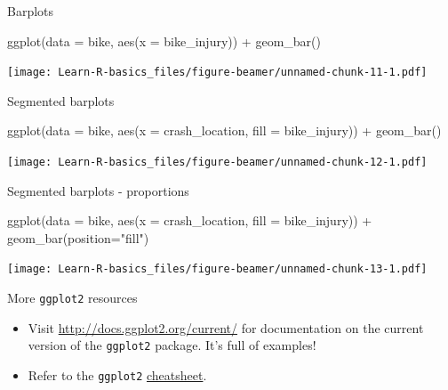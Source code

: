 \documentclass[
  ignorenonframetext,
]{beamer}
\newenvironment{Shaded}{\begin{snugshade}}{\end{snugshade}}
\newcommand{\AttributeTok}[1]{\textcolor[rgb]{0.77,0.63,0.00}{#1}}
\newcommand{\FunctionTok}[1]{\textcolor[rgb]{0.00,0.00,0.00}{#1}}
\newcommand{\NormalTok}[1]{#1}
\newcommand{\SpecialCharTok}[1]{\textcolor[rgb]{0.00,0.00,0.00}{#1}}
\newcommand{\StringTok}[1]{\textcolor[rgb]{0.31,0.60,0.02}{#1}}
\begin{document}
\begin{frame}[fragile]{Barplots}
\protect\hypertarget{barplots}{}
\begin{Shaded}
\begin{Highlighting}[]
\FunctionTok{ggplot}\NormalTok{(}\AttributeTok{data =}\NormalTok{ bike, }\FunctionTok{aes}\NormalTok{(}\AttributeTok{x =}\NormalTok{ bike\_injury)) }\SpecialCharTok{+}
  \FunctionTok{geom\_bar}\NormalTok{()}
\end{Highlighting}
\end{Shaded}

\texttt{[image: Learn-R-basics\_files/figure-beamer/unnamed-chunk-11-1.pdf]}
\end{frame}

\begin{frame}[fragile]{Segmented barplots}
\protect\hypertarget{segmented-barplots}{}
\begin{Shaded}
\begin{Highlighting}[]
\FunctionTok{ggplot}\NormalTok{(}\AttributeTok{data =}\NormalTok{ bike, }\FunctionTok{aes}\NormalTok{(}\AttributeTok{x =}\NormalTok{ crash\_location, }\AttributeTok{fill =}\NormalTok{ bike\_injury)) }\SpecialCharTok{+}
  \FunctionTok{geom\_bar}\NormalTok{()}
\end{Highlighting}
\end{Shaded}

\texttt{[image: Learn-R-basics\_files/figure-beamer/unnamed-chunk-12-1.pdf]}
\end{frame}

\begin{frame}[fragile]{Segmented barplots - proportions}
\protect\hypertarget{segmented-barplots---proportions}{}
\begin{Shaded}
\begin{Highlighting}[]
\FunctionTok{ggplot}\NormalTok{(}\AttributeTok{data =}\NormalTok{ bike, }\FunctionTok{aes}\NormalTok{(}\AttributeTok{x =}\NormalTok{ crash\_location, }\AttributeTok{fill =}\NormalTok{ bike\_injury)) }\SpecialCharTok{+}
  \FunctionTok{geom\_bar}\NormalTok{(}\AttributeTok{position=}\StringTok{"fill"}\NormalTok{)}
\end{Highlighting}
\end{Shaded}

\texttt{[image: Learn-R-basics\_files/figure-beamer/unnamed-chunk-13-1.pdf]}
\end{frame}

\begin{frame}[fragile]{More \texttt{ggplot2} resources}
\protect\hypertarget{more-ggplot2-resources}{}
\begin{itemize}
\item
  Visit \url{http://docs.ggplot2.org/current/} for documentation on the
  current version of the \texttt{ggplot2} package. It's full of
  examples!
\item
  Refer to the \texttt{ggplot2}
  \href{https://www.rstudio.com/wp-content/uploads/2015/08/ggplot2-cheatsheet.pdf}{cheatsheet}.
\end{itemize}
\end{frame}
\end{document}
